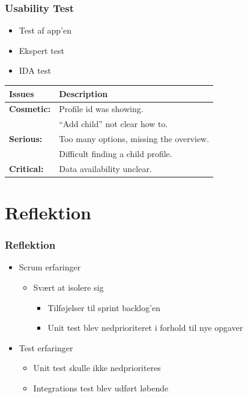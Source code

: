 \documentclass{beamer}
\begin{document}
\begin{frame}
	\frametitle{Usability Test}
	\begin{itemize}
		\item Test af app'en
		\item Ekspert test
		\item IDA test
	\end{itemize}
	\begin{table}[!h]
	\centering
		\begin{tabular}{| p{2cm} | m{7cm} |}
			\hline
			\textbf{Issues} 	& \textbf{Description} \\ \hline
			
			\textbf{Cosmetic:}	& Profile id was showing. \\ 
								& ``Add child'' not clear how to. \\ \hline
							
			\textbf{Serious:}	& Too many options, missing the overview. \\
								& Difficult finding a child profile. \\ \hline
						
			\textbf{Critical:} 	& Data availability unclear. \\ \hline
		\end{tabular}
	\label{tab:usability_test_results}
\end{table}
\end{frame}

\section{Reflektion}

\begin{frame}
	\frametitle{Reflektion}
	\begin{itemize}
		\item Scrum erfaringer
		\begin{itemize}
			\item Sv\ae{}rt at isolere sig
			\begin{itemize}
				\item Tilf\o{}jelser til sprint backlog'en
				\item Unit test blev nedprioriteret i forhold til nye opgaver
			\end{itemize}
		\end{itemize}
		\item Test erfaringer
		\begin{itemize}
			\item Unit test skulle ikke nedprioriteres
			\item Integrations test blev udf\o{}rt l\o{}bende
		\end{itemize}
		
	\end{itemize}
\end{frame}
\end{document}
